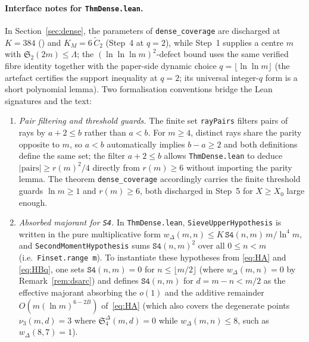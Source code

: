 \documentclass[11pt]{article}
\theoremstyle{plain}
\theoremstyle{definition}
\newcommand{\rch}{r}
\begin{document}
\paragraph{Interface notes for \texttt{ThmDense.lean}.}
In Section~\ref{sec:dense}, the parameters of \texttt{dense\_coverage}
are discharged at $K = 384$ (\cite[Theorem~5.7]{hr}) and
$K_M = 6\,\widetilde C_2$ (Step~4 at $q = 2$), while Step~1 supplies
a centre $m$ with
$\mathfrak{S}_2(2m) \le \Lambda$; the $(\ln\ln\ln m)^2$-defect bound
uses the same verified fibre identity together with the paper-side
dynamic choice $q = \lfloor \ln\ln m \rfloor$ (the artefact
certifies the support inequality at $q = 2$; its universal
integer-$q$ form is a short polynomial lemma). Two formalisation
conventions
bridge the Lean signatures and the text:
\begin{enumerate}
\item \emph{Pair filtering and threshold guards.} The finite set
      \texttt{rayPairs} filters pairs of rays by $a + 2 \le b$
      rather than $a < b$. For $m \ge 4$, distinct rays share the
      parity opposite to $m$, so $a < b$ automatically implies
      $b - a \ge 2$ and both definitions define the same set; the
      filter $a + 2 \le b$ allows \texttt{ThmDense.lean} to deduce
      $|\mathrm{pairs}| \ge \rch(m)^2/4$ directly from
      $\rch(m) \ge 6$ without importing the parity lemma. The
      theorem \texttt{dense\_coverage} accordingly carries the
      finite threshold guards $\ln m \ge 1$ and $\rch(m) \ge 6$,
      both discharged in Step~5 for $X \ge X_0$ large enough.
\item \emph{Absorbed majorant for \texttt{S4}.} In
      \texttt{ThmDense.lean}, \texttt{SieveUpperHypothesis} is
      written in the pure multiplicative form
      $w_\Delta(m,n) \le K\,\mathtt{S4}(n,m)\, m/\ln^4 m$, and
      \texttt{SecondMomentHypothesis} sums $\mathtt{S4}(n,m)^2$ over
      all $0 \le n < m$ (i.e.\ \texttt{Finset.range m}). To
      instantiate these hypotheses from \eqref{eq:HA} and
      \eqref{eq:HBq}, one sets $\mathtt{S4}(n,m) = 0$ for
      $n \le \lfloor m/2 \rfloor$ (where $w_\Delta(m,n) = 0$ by
      Remark~\ref{rem:dsarc}) and defines $\mathtt{S4}(n,m)$ for
      $d = m - n < m/2$ as the effective majorant absorbing the
      $o(1)$ and the additive remainder $O(m(\ln m)^{6-2B})$
      of~\eqref{eq:HA} (which also covers the degenerate points
      $\nu_3(m,d) = 3$ where $\mathfrak{S}_4^{\Delta}(m,d) = 0$
      while $w_\Delta(m,n) \le 8$, such as $w_\Delta(8,7) = 1$).
\end{enumerate}
\end{document}
